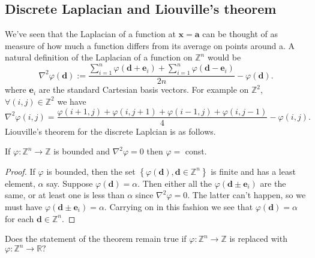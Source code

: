 \subsection{Discrete Laplacian and Liouville’s theorem}
We've seen that the Laplacian of a function at $\mathbf{x}=\mathbf{a}$ can be thought of as measure of how much a function differs from its average on points around a. A natural definition of the Laplacian of a function on $\mathbb{Z}^{n}$ would be
\[
\nabla^{2} \varphi(\mathbf{d}):=\frac{\sum_{i=1}^{n} \varphi\left(\mathbf{d}+\mathbf{e}_{i}\right)+\sum_{i=1}^{n} \varphi\left(\mathbf{d}-\mathbf{e}_{i}\right)}{2 n}-\varphi(\mathbf{d}).
\]
where $\mathbf{e}_{i}$ are the standard Cartesian basis vectors. For example on $\mathbb{Z}^{2}$, $ \forall (i, j) \in \mathbb{Z}^{2} $ we have
\[
    \nabla^{2} \varphi(i, j)=\frac{\varphi(i+1, j)+\varphi(i, j+1)+\varphi(i-1, j)+\varphi(i, j-1)}{4}-\varphi(i, j).
\]
Liouville's theorem for the discrete Laplcian is as follows.

\begin{theorem}[Liouville]
    If $\varphi: \mathbb{Z}^{n} \rightarrow \mathbb{Z}$ is bounded and $\nabla^{2} \varphi=0$ then $\varphi=$ const.
\end{theorem}

\begin{proof}
    If $\varphi$ is bounded, then the set $\left\{\varphi(\mathbf{d}), \mathbf{d} \in \mathbb{Z}^{n}\right\}$ is finite and has a least element, $\alpha$ say. Suppose $\varphi(\mathbf{d})=\alpha$. Then either all the $\varphi\left(\mathbf{d} \pm \mathbf{e}_{i}\right)$ are the same, or at least one is less than $\alpha$ since $\nabla^{2} \varphi=0 .$ The latter can't happen, so we must have $\varphi\left(\mathbf{d} \pm \mathbf{e}_{i}\right)=\alpha$. Carrying on in this fashion we see that $\varphi(\mathbf{d})=\alpha$ for each $\mathbf{d} \in \mathbb{Z}^{n}$.
\end{proof}

\begin{sque}
    Does the statement of the theorem remain true if $\varphi: \mathbb{Z}^{n} \rightarrow \mathbb{Z}$ is replaced with $\varphi: \mathbb{Z}^{n} \rightarrow \mathbb{R} ?$
\end{sque}